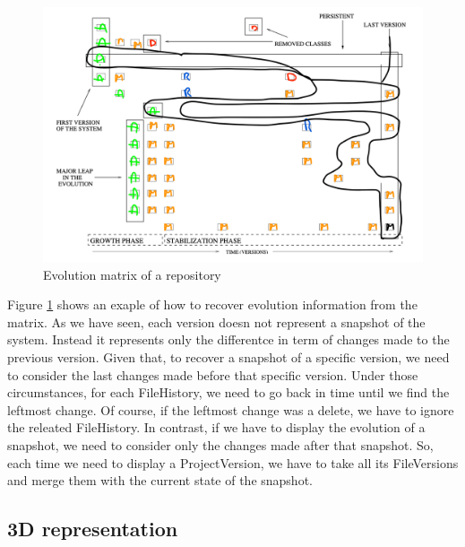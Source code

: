 \begin{figure}
    \center
    \includegraphics[width=\textwidth]{ApproachMatrix2.png}
    \caption{Evolution matrix of a repository}
    \label{fig:evolutionMatrixApproach2}
\end{figure}

Figure  \ref{fig:evolutionMatrixApproach2} shows an exaple of how to recover evolution information from the matrix. 
As we have seen, each version doesn not represent a snapshot of the system.
Instead it represents only the differentce in term of changes made to the previous version. 
Given that, to recover a snapshot of a specific version, we need to consider the last changes made before that specific version.
Under those circumstances, for each FileHistory, we need to go back in time until we find the leftmost change. Of course, if the leftmost change was a delete, we have to ignore the releated FileHistory.
In contrast, if we have to display the evolution of a snapshot, we need to consider only the changes made after that snapshot. 
So, each time we need to display a ProjectVersion, we have to take all its FileVersions and merge them with the current state of the snapshot. 

\subsection*{3D representation}

